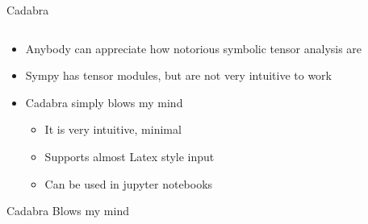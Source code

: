 \documentclass[aspectratio=169]{beamer}
\begin{document}
\begin{frame}[fragile]{Cadabra}
     \begin{columns}
        \begin{column}{0.52\textwidth}
            \begin{itemize}
                \item Anybody can appreciate how notorious symbolic tensor analysis are
                \item Sympy has tensor modules, but are not very intuitive to work
                \item Cadabra simply blows my mind
                    \begin{itemize}
                        \item It is very intuitive, minimal 
                        \item Supports almost Latex style input
                        \item Can be used in jupyter notebooks
                    \end{itemize}
            \end{itemize}
            \begin{block}{Cadabra}
                Blows my mind
            \end{block}
        \end{column}
        \begin{column}{0.46\textwidth}
        \end{column}
    \end{columns}
\end{frame} 
%
\end{document}
